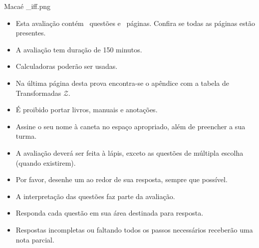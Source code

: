 \documentclass{yagoexam}
\begin{document}
 
	
{Macaé} %
{_iff.png} %
	
\maketitle

\begin{itemize}
		
	\item Esta avaliação contém \numquestions\ questões e \numpages\ páginas. Confira se todas as páginas estão presentes.
	
	\item A avaliação tem duração de 150 minutos.
		
	\item Calculadoras poderão ser usadas. 
	
	\item Na última página desta prova encontra-se o apêndice com a tabela de Transformadas $\mathcal{Z}$.
		
	\item É proibido portar livros, manuais e anotações.
		
	\item Assine o seu nome à caneta no espaço apropriado, além de preencher a sua turma.
		
	\item A avaliação deverá ser feita à lápis, exceto as questões de múltipla escolha (quando existirem).  
		
	\item Por favor, desenhe um  ao redor de sua resposta, sempre que possível. 
		
	\item A interpretação das questões faz parte da avaliação.
		
	\item Responda cada questão em sua área destinada para resposta.
	
		
	\item Respostas incompletas ou faltando todos os passos necessários receberão uma nota parcial.
		
\end{itemize}
\newpage %
	
\end{document}
